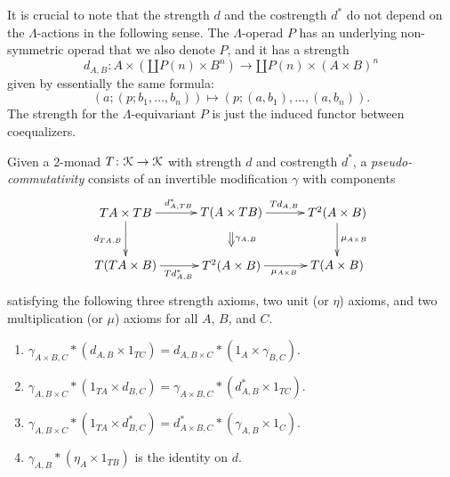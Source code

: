 \begin{rem}\label{rem:strength-nonsym}
It is crucial to note that the strength $d$ and the costrength $d^{*}$ do not depend on the $\Lambda$-actions in the following sense. The $\Lambda$-operad $P$ has an underlying non-symmetric operad that we also denote $P$, and it has a strength
  \[
    d_{A,B} \colon A \times \left(\amalg P(n) \times B^n\right) \rightarrow \amalg P(n) \times \left(A \times B \right)^n
  \]
given by essentially the same formula:
  \[
    \left( a; (p; b_{1}, \ldots, b_{n}) \right) \mapsto \left(p; (a,b_{1}), \ldots, (a, b_{n})\right).
  \]
The strength for the $\Lambda$-equivariant $P$ is just the induced functor between coequalizers.
\end{rem}

\begin{Defi}\label{Defi:pscommute}
    Given a $2$-monad $T \colon \mathcal{K} \rightarrow \mathcal{K}$ with strength $d$ and costrength $d^{\ast}$, a \textit{pseudo-commutativity} consists of an invertible modification $\gamma$ with components
      \[
        \xy
            (0,0)*+{TA \times TB}="00";
            (30,0)*+{T(A \times TB)}="10";
            (60,0)*+{T^2(A \times B)}="20";
            (0,-15)*+{T(TA \times B)}="01";
            (30,-15)*+{T^2(A \times B)}="11";
            (60,-15)*+{T(A \times B)}="21";
            {\ar^{d^{\ast}_{A,TB}} "00" ; "10"};
            {\ar^{Td_{A,B}} "10" ; "20"};
            {\ar^{\mu_{A \times B}} "20" ; "21"};
            {\ar_{d_{TA,B}} "00" ; "01"};
            {\ar_{Td^{\ast}_{A,B}} "01" ; "11"};
            {\ar_{\mu_{A \times B}} "11" ; "21"};
            {\ar@{=>}^{\gamma_{A,B}} (30,-5.5) ; (30,-9.5)};
        \endxy
      \]
satisfying the following three strength axioms, two unit (or $\eta$) axioms, and two multiplication (or $\mu$) axioms for all $A$, $B$, and $C$.
    \begin{enumerate}
        \item\label{axiom:ps_comm_str_1} $\gamma_{A \times B,C} * (d_{A,B} \times 1_{TC}) = d_{A,B \times C} * (1_A \times \gamma_{B,C})$.
        \item\label{axiom:ps_comm_str_2} $\gamma_{A,B \times C} * (1_{TA} \times d_{B,C}) = \gamma_{A \times B, C} * (d^{\ast}_{A,B} \times 1_{TC})$.
        \item\label{axiom:ps_comm_str_3} $\gamma_{A,B \times C} * (1_{TA} \times d^{\ast}_{B,C}) = d^{\ast}_{A \times B,C} * (\gamma_{A,B} \times 1_{C})$.
        \item\label{axiom:ps_comm_unit_1} $\gamma_{A,B} * (\eta_A \times 1_{TB})$  is the identity on $d$.

\end{enumerate}
\end{Defi}
